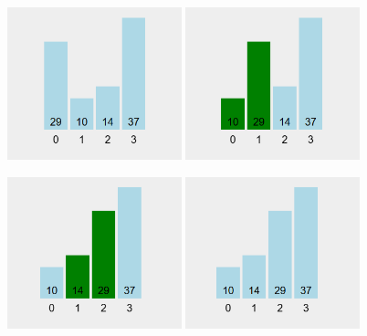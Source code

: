 \documentclass{report}
\begin{document}
	\begin{figure}[h]
		\centering
		\includegraphics[width=0.45\textwidth]{imagens/bubble-sort1.png}
		\hfill
		\includegraphics[width=0.45\textwidth]{imagens/bubble-sort2.png}

	\end{figure}
	
	\begin{figure}[h]
		\centering
		\includegraphics[width=0.45\textwidth]{imagens/bubble-sort3.png}
		\hfill
		\includegraphics[width=0.45\textwidth]{imagens/bubble-sort4.png}
		
	\end{figure}
\end{document}
